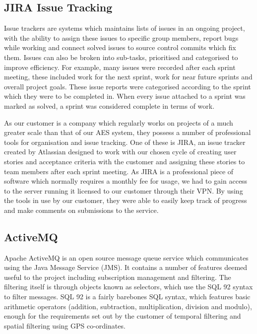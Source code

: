 \documentclass[a4paper, 12pt]{article}
\begin{document}
\subsection{JIRA Issue Tracking}

Issue trackers are systems which maintains lists of issues in an ongoing project, with the ability to assign these issues to specific group members, report bugs while working and connect solved issues to source control commits which fix them. Issues can also be broken into sub-tasks, prioritised and categorised to improve efficiency. For example, many issues were recorded after each sprint meeting, these included work for the next sprint, work for near future sprints and overall project goals. These issue reports were categorised according to the sprint which they were to be completed in. When every issue attached to a sprint was marked as solved, a sprint was considered complete in terms of work.

As our customer is a company which regularly works on projects of a much greater scale than that of our AES system, they possess a number of professional tools for organisation and issue tracking. One of these is JIRA, an issue tracker created by Atlassian designed to work with our chosen cycle of creating user stories and acceptance criteria with the customer and assigning these stories to team members after each sprint meeting. As JIRA is a professional piece of software which normally requires a monthly fee for usage, we had to gain access to the server running it licensed to our customer through their VPN. By using the tools in use by our customer, they were able to easily keep track of progress and make comments on submissions to the service.

\subsection{ActiveMQ}

Apache ActiveMQ is an open source message queue service which communicates using the Java Message Service (JMS). It contains a number of features deemed useful to the project including subscription management and filtering. The filtering itself is through objects known as selectors, which use the SQL 92 syntax to filter messages. SQL 92 is a fairly barebones SQL syntax, which features basic arithmetic operators (addition, subtraction, multiplication, division and modulo), enough for the requirements set out by the customer of temporal filtering and spatial filtering using GPS co-ordinates.
\end{document}
